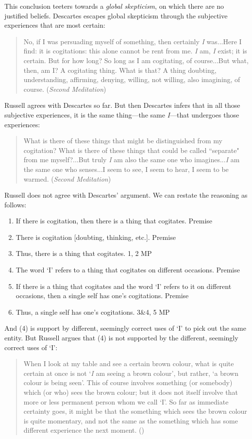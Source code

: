 \documentclass[oneside,letterpaper,12pt]{book}
\begin{document}
This conclusion teeters towards a \textit{global skepticism}, on which there are no justified beliefs. Descartes escapes global skepticism through the subjective experiences that are most certain:
\begin{quote}
	No, if I was persuading myself of something, then certainly \textit{I} was...Here I find: it is cogitations: this alone cannot be rent from me. \textit{I} am, \textit{I} exist; it is certain. But for how long? So long as I am cogitating, of course...But what, then, am I? A cogitating thing. What is that? A thing doubting, understanding, affirming, denying, willing, not willing, also imagining, of course. (\textit{Second Meditation})
\end{quote}
Russell agrees with Descartes so far. But then Descartes infers that in all those subjective experiences, it is the same thing---the same \textit{I}---that undergoes those experiences:
\begin{quote}
	What is there of these things that might be distinguished from my cogitation? What is there of these things that could be called ``separate" from me myself?...But truly \textit{I} am also the same one who imagines...\textit{I} am the same one who senses...I seem to see, I seem to hear, I seem to be warmed. (\textit{Second Meditation})
\end{quote}
Russell does not agree with Descartes' argument. We can restate the reasoning as follows:
\begin{enumerate}
	\item If there is cogitation, then there is a thing that cogitates. \hfill Premise
	\item There is cogitation [doubting, thinking, etc.]. \hfill Premise
	\item Thus, there is a thing that cogitates. \hfill 1, 2 MP
	\item The word `I' refers to a thing that cogitates on different occasions. \hfill Premise
	\item If there is a thing that cogitates and the word `I' refers to it on different occasions, then a single self has one's cogitations. \hfill Premise
	\item Thus, a single self has one's cogitations. \hfill 3\&4, 5 MP
\end{enumerate}
And (4) is support by different, seemingly correct uses of `I' to pick out the same entity. But Russell argues that (4) is not supported by the different, seemingly correct uses of `I':
\begin{quote}
	When I look at my table and see a certain brown colour, what is quite certain at once is not `\textit{I} am seeing a brown colour', but rather, `a brown colour is being seen'. This of course involves something (or somebody) which (or who) sees the brown colour; but it does not itself involve that more or less permanent person whom we call `I'. So far as immediate certainty goes, it might be that the something which sees the brown colour is quite momentary, and not the same as the something which has some different experience the next moment. (\pageref{self})
\end{quote}
\end{document}
